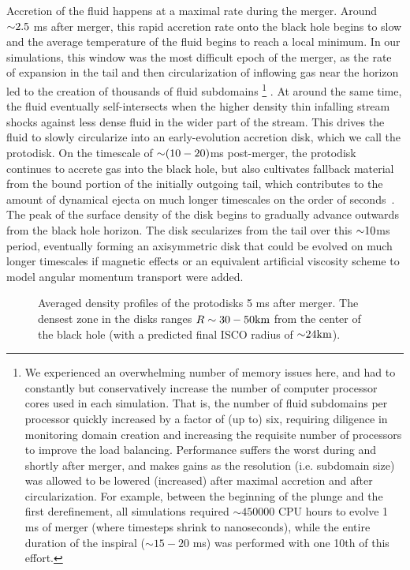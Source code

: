Accretion of the fluid happens at a maximal rate during the merger. 
Around $\mathord{\sim} 2.5$ ms after merger, this rapid accretion rate onto the black hole begins to slow and the average temperature of the fluid begins to reach a local minimum.
In our simulations, this window was the most difficult epoch of the merger, as the rate of expansion in the tail and then circularization of inflowing gas near the horizon led to the creation of thousands of fluid subdomains
\footnote{
We experienced an overwhelming number of memory issues here, and had to constantly but conservatively increase the number of computer processor cores used in each simulation.
That is, the number of fluid subdomains per processor quickly increased by a factor of (up to) six, requiring diligence in monitoring domain creation and increasing the requisite number of processors to improve the load balancing.
Performance suffers the worst during and shortly after merger, and makes gains as the resolution (i.e. subdomain size) was allowed to be lowered (increased) after maximal accretion and after circularization.  
For example, between the beginning of the plunge and the first derefinement, all simulations required $\sim 450000$ CPU hours to evolve 1 ms of merger (where timesteps shrink to nanoseconds), while the entire duration of the inspiral ($\sim 15 - 20$ ms) was performed with one 10th of this effort. 
}
.
At around the same time, the fluid eventually self-intersects when the higher density thin infalling stream shocks against less dense fluid in the wider part of the stream.
This drives the fluid to slowly circularize into an early-evolution accretion disk, which we call the protodisk.
On the timescale of $\mathord{\sim} (10-20)$ms post-merger, the protodisk continues to accrete gas into the black hole, but also cultivates fallback material from the bound portion of the initially outgoing tail, which contributes to the  amount of dynamical ejecta on much longer timescales on the order of seconds~\cite{Fernandez2013,Just2014}.
The peak of the surface density of the disk begins to gradually advance outwards from the black hole horizon.
The disk secularizes from the tail over this $\mathord{\sim} 10$ms period,
eventually forming an axisymmetric disk that could be evolved on much longer timescales if magnetic effects or an equivalent artificial viscosity scheme to model angular momentum transport were added.

\begin{figure}
	\centering
	
	\caption[Density profiles of the protodisks 5 ms after merger]{
		Averaged density profiles of the protodisks 5 ms after merger.  The densest zone in the disks ranges $R \sim 30 - 50 {\rm km}$ from the center of the black hole (with a predicted final ISCO radius of $\mathord{\sim} 24 {\rm km}$).  
	}
	\label{fig:diskdensities}
\end{figure}


